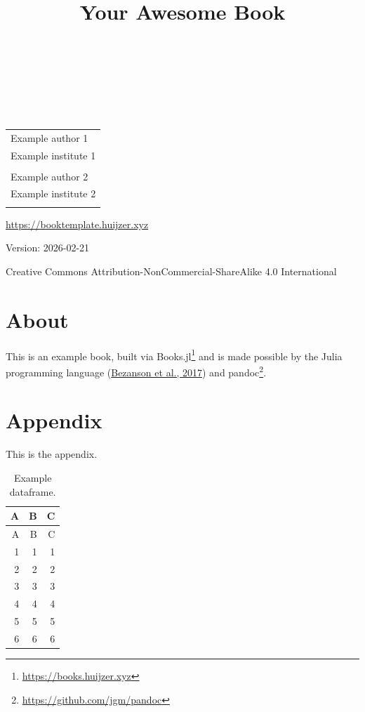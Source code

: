 \documentclass[
  notoc %
]{tufte-book}
\title{Your Awesome Book}
\author{\noindent{Example author 1}\\[3mm] \noindent{Example author
2}\\[3mm] }
\date{}
\DeclareRobustCommand{\href}[2]{#2\footnote{\url{#1}}}
\begin{document}
\makeatletter
\thispagestyle{empty}
\vfill
{\Huge\bf
\noindent
\@title
}\\[1in]
{\Large
\noindent
\@author
}
\makeatother

\makeatletter
\newpage
\thispagestyle{empty}
\vfill
{\noindent
\begin{tabular}{l} Example author 1\\ Example institute 1\\ \\ Example author 2\\ Example institute 2\\ \\ \end{tabular}
}
\vfill
{\small
\url{https://booktemplate.huijzer.xyz}

Version: 2026-02-21

Creative Commons Attribution-NonCommercial-ShareAlike 4.0 International
}
\makeatother


\frontmatter
\mainmatter
{}

\setcounter{tocdepth}{1}
\tableofcontents

\justifying

\setlength{\parindent}{0pt}

\hypertarget{sec:about}{%
\chapter{About}\label{sec:about}}

This is an example book, built via
\href{https://books.huijzer.xyz}{Books.jl} and is made possible by the
Julia programming language
(\protect\hyperlink{ref-bezanson2017julia}{Bezanson et al., 2017}) and
\href{https://github.com/jgm/pandoc}{pandoc}.

\hypertarget{appendix}{%
\chapter*{Appendix}\label{appendix}}

This is the appendix.

\hypertarget{tbl:example_dataframe}{}
\begin{longtable}[]{@{}rrr@{}}
\caption{\label{tbl:example_dataframe}Example dataframe.}\tabularnewline
\toprule()
A & B & C \\
\midrule()
\endfirsthead
\toprule()
A & B & C \\
\midrule()
\endhead
1 & 1 & 1 \\
2 & 2 & 2 \\
3 & 3 & 3 \\
4 & 4 & 4 \\
5 & 5 & 5 \\
6 & 6 & 6 \\
\bottomrule()
\end{longtable}
\end{document}
